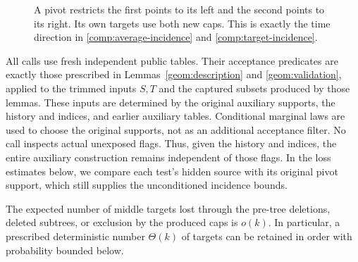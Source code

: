 \begin{figure}[tb]
\centering
{}
\caption{A pivot restricts the first points to its left and
the second points to its right. Its own targets use both
new caps. This is exactly the time direction in
\eqref{comp:average-incidence} and
\eqref{comp:target-incidence}.}
\label{comp:tree-figure}
\end{figure}

All calls use fresh independent public tables. Their
acceptance predicates are exactly those prescribed in
Lemmas~\ref{geom:description} and \ref{geom:validation},
applied to the trimmed inputs \(S,T\) and the captured
subsets produced by those lemmas. These inputs are
determined by the original auxiliary supports, the
history and indices, and earlier auxiliary tables.
Conditional marginal laws are used to choose the original
supports, not as an additional acceptance filter.
No call inspects actual unexposed flags. Thus, given the
history and indices, the entire auxiliary construction
remains independent of those flags. In the loss estimates
below, we compare each test's hidden source with its
original pivot support, which still supplies the
unconditioned incidence bounds.

\begin{lemma}\label{comp:tree-loss}
The expected number of middle targets lost through the
pre-tree deletions, deleted subtrees, or exclusion by the
produced caps is \(o(k)\). In particular, a prescribed
deterministic number \(\Theta(k)\) of targets can be retained in order
with probability bounded below.
\end{lemma}

